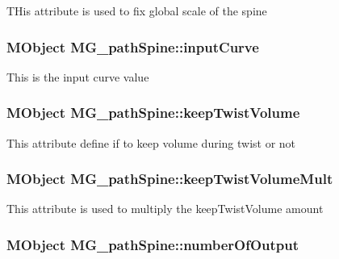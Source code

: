 T\-His attribute is used to fix global scale of the spine \hypertarget{class_m_g__path_spine_ab44d5346a186856f9cee0e0b4b50b6b7}{
\subsubsection[{input\-Curve}]{\setlength{\rightskip}{0pt plus 5cm}M\-Object M\-G\-\_\-path\-Spine\-::input\-Curve\hspace{0.3cm}{\ttfamily [static]}}}\label{class_m_g__path_spine_ab44d5346a186856f9cee0e0b4b50b6b7}
This is the input curve value \hypertarget{class_m_g__path_spine_a4c6cb4b1690e8704961a9e9a103c47a0}{
\subsubsection[{keep\-Twist\-Volume}]{\setlength{\rightskip}{0pt plus 5cm}M\-Object M\-G\-\_\-path\-Spine\-::keep\-Twist\-Volume\hspace{0.3cm}{\ttfamily [static]}}}\label{class_m_g__path_spine_a4c6cb4b1690e8704961a9e9a103c47a0}
This attribute define if to keep volume during twist or not \hypertarget{class_m_g__path_spine_adc3fed052e585c7b2f8345774c8e2d86}{
\subsubsection[{keep\-Twist\-Volume\-Mult}]{\setlength{\rightskip}{0pt plus 5cm}M\-Object M\-G\-\_\-path\-Spine\-::keep\-Twist\-Volume\-Mult\hspace{0.3cm}{\ttfamily [static]}}}\label{class_m_g__path_spine_adc3fed052e585c7b2f8345774c8e2d86}
This attribute is used to multiply the keep\-Twist\-Volume amount \hypertarget{class_m_g__path_spine_aed8434ed311d207b479f4418ca1bb432}{
\subsubsection[{number\-Of\-Output}]{\setlength{\rightskip}{0pt plus 5cm}M\-Object M\-G\-\_\-path\-Spine\-::number\-Of\-Output\hspace{0.3cm}{\ttfamily [static]}}}\label{class_m_g__path_spine_aed8434ed311d207b479f4418ca1bb432}
